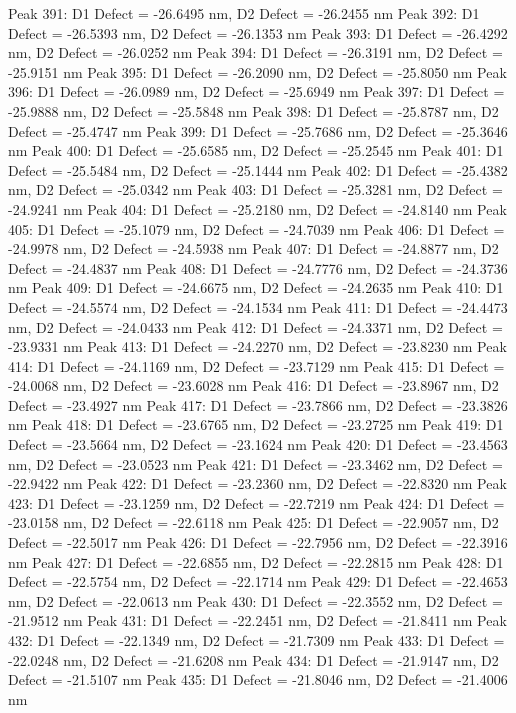 \documentclass{article}
\begin{document}
Peak 391: D1 Defect = -26.6495 nm, D2 Defect = -26.2455 nm
Peak 392: D1 Defect = -26.5393 nm, D2 Defect = -26.1353 nm
Peak 393: D1 Defect = -26.4292 nm, D2 Defect = -26.0252 nm
Peak 394: D1 Defect = -26.3191 nm, D2 Defect = -25.9151 nm
Peak 395: D1 Defect = -26.2090 nm, D2 Defect = -25.8050 nm
Peak 396: D1 Defect = -26.0989 nm, D2 Defect = -25.6949 nm
Peak 397: D1 Defect = -25.9888 nm, D2 Defect = -25.5848 nm
Peak 398: D1 Defect = -25.8787 nm, D2 Defect = -25.4747 nm
Peak 399: D1 Defect = -25.7686 nm, D2 Defect = -25.3646 nm
Peak 400: D1 Defect = -25.6585 nm, D2 Defect = -25.2545 nm
Peak 401: D1 Defect = -25.5484 nm, D2 Defect = -25.1444 nm
Peak 402: D1 Defect = -25.4382 nm, D2 Defect = -25.0342 nm
Peak 403: D1 Defect = -25.3281 nm, D2 Defect = -24.9241 nm
Peak 404: D1 Defect = -25.2180 nm, D2 Defect = -24.8140 nm
Peak 405: D1 Defect = -25.1079 nm, D2 Defect = -24.7039 nm
Peak 406: D1 Defect = -24.9978 nm, D2 Defect = -24.5938 nm
Peak 407: D1 Defect = -24.8877 nm, D2 Defect = -24.4837 nm
Peak 408: D1 Defect = -24.7776 nm, D2 Defect = -24.3736 nm
Peak 409: D1 Defect = -24.6675 nm, D2 Defect = -24.2635 nm
Peak 410: D1 Defect = -24.5574 nm, D2 Defect = -24.1534 nm
Peak 411: D1 Defect = -24.4473 nm, D2 Defect = -24.0433 nm
Peak 412: D1 Defect = -24.3371 nm, D2 Defect = -23.9331 nm
Peak 413: D1 Defect = -24.2270 nm, D2 Defect = -23.8230 nm
Peak 414: D1 Defect = -24.1169 nm, D2 Defect = -23.7129 nm
Peak 415: D1 Defect = -24.0068 nm, D2 Defect = -23.6028 nm
Peak 416: D1 Defect = -23.8967 nm, D2 Defect = -23.4927 nm
Peak 417: D1 Defect = -23.7866 nm, D2 Defect = -23.3826 nm
Peak 418: D1 Defect = -23.6765 nm, D2 Defect = -23.2725 nm
Peak 419: D1 Defect = -23.5664 nm, D2 Defect = -23.1624 nm
Peak 420: D1 Defect = -23.4563 nm, D2 Defect = -23.0523 nm
Peak 421: D1 Defect = -23.3462 nm, D2 Defect = -22.9422 nm
Peak 422: D1 Defect = -23.2360 nm, D2 Defect = -22.8320 nm
Peak 423: D1 Defect = -23.1259 nm, D2 Defect = -22.7219 nm
Peak 424: D1 Defect = -23.0158 nm, D2 Defect = -22.6118 nm
Peak 425: D1 Defect = -22.9057 nm, D2 Defect = -22.5017 nm
Peak 426: D1 Defect = -22.7956 nm, D2 Defect = -22.3916 nm
Peak 427: D1 Defect = -22.6855 nm, D2 Defect = -22.2815 nm
Peak 428: D1 Defect = -22.5754 nm, D2 Defect = -22.1714 nm
Peak 429: D1 Defect = -22.4653 nm, D2 Defect = -22.0613 nm
Peak 430: D1 Defect = -22.3552 nm, D2 Defect = -21.9512 nm
Peak 431: D1 Defect = -22.2451 nm, D2 Defect = -21.8411 nm
Peak 432: D1 Defect = -22.1349 nm, D2 Defect = -21.7309 nm
Peak 433: D1 Defect = -22.0248 nm, D2 Defect = -21.6208 nm
Peak 434: D1 Defect = -21.9147 nm, D2 Defect = -21.5107 nm
Peak 435: D1 Defect = -21.8046 nm, D2 Defect = -21.4006 nm
\end{document}
